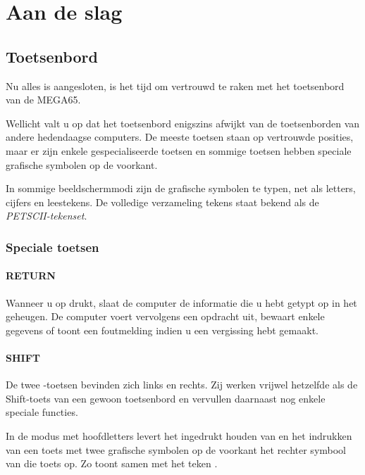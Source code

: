 \chapter{Aan de slag}
\hypersetup{bookmarksdepth=5}

\section{Toetsenbord}
\label{cha:getting-started}

Nu alles is aangesloten, is het tijd om vertrouwd te raken met het toetsenbord van de MEGA65.

Wellicht valt u op dat het toetsenbord enigszins afwijkt van de toetsenborden van andere hedendaagse computers. De meeste toetsen staan op vertrouwde posities, maar er zijn enkele gespecialiseerde toetsen en sommige toetsen hebben speciale grafische symbolen op de voorkant.

In sommige beeldschermmodi zijn de grafische symbolen te typen, net als letters, cijfers en leestekens. De volledige verzameling tekens staat bekend als de {\em PETSCII-tekenset}.

\subsection{Speciale toetsen}

\subsubsection{RETURN}
Wanneer u op  drukt, slaat de computer de informatie die u hebt getypt op in het geheugen. De computer voert vervolgens een opdracht uit, bewaart enkele gegevens of toont een foutmelding indien u een vergissing hebt gemaakt.

\subsubsection{SHIFT}
De twee -toetsen bevinden zich links en rechts. Zij werken vrijwel hetzelfde als de Shift-toets van een gewoon toetsenbord en vervullen daarnaast nog enkele speciale functies.

In de modus met hoofdletters levert het ingedrukt houden van  en het indrukken van een toets met twee grafische symbolen op de voorkant het rechter symbool van die toets op. Zo toont  samen met  het teken .

